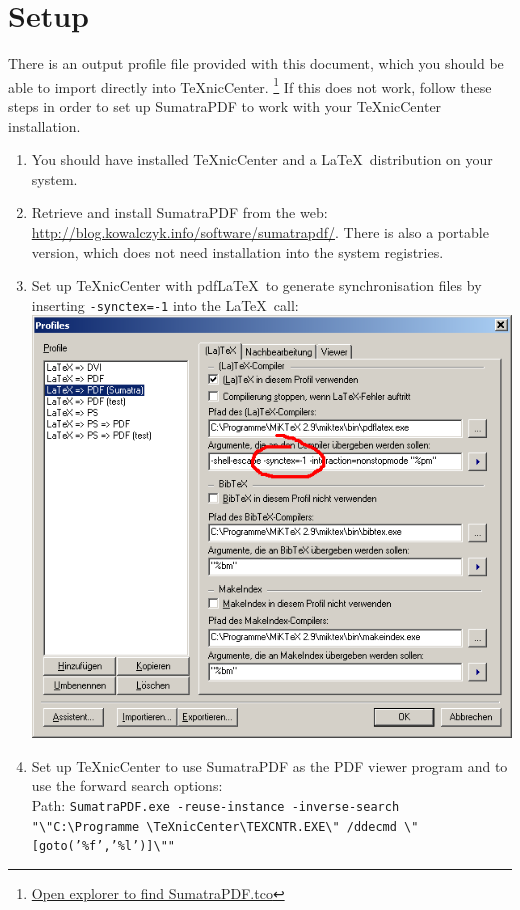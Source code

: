 \documentclass{article}
\begin{document}
\section{Setup}
There is an output profile file provided with this document, which you should be able to import directly into TeXnicCenter.
\footnote{\href{run:.}{Open explorer to find SumatraPDF.tco}}
If this does not work, follow these steps in order to set up SumatraPDF to work with your TeXnicCenter installation.
\begin{enumerate}
	\item You should have installed TeXnicCenter and a \LaTeX\ distribution on your system.
	\item Retrieve and install SumatraPDF from the web: \url{http://blog.kowalczyk.info/software/sumatrapdf/}. There is also a portable version, which does not need installation into the system registries.
	\item Set up TeXnicCenter with pdf\LaTeX\ to generate synchronisation files by inserting \texttt{-synctex=-1} into the \LaTeX\ call:\\
	      \includegraphics[width=\textwidth]{images/sumatrapdf_latex}
	\clearpage
	\item Set up TeXnicCenter to use SumatraPDF as the PDF viewer program and to use the forward search options:\\
	      Path: \texttt{SumatraPDF.exe -reuse-instance -inverse-search "\textbackslash"C:\textbackslash Programme \textbackslash TeXnicCenter\textbackslash TEXCNTR.EXE\textbackslash" /ddecmd \textbackslash"[goto('\%f','\%l')]\textbackslash""}  \\

\end{enumerate}
\end{document}
